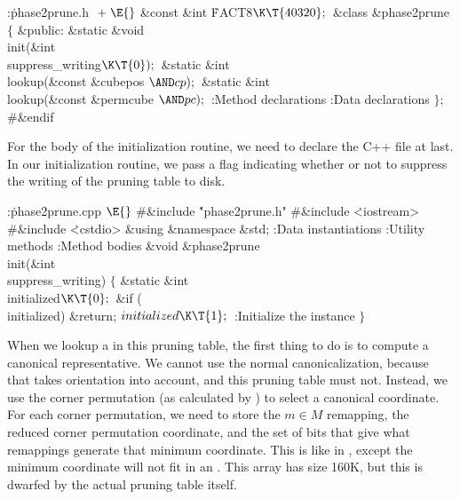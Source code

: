 \Y\B\4:\.{phase2prune.h }\X${}\mathrel+\E{}$\6
\&{const} \&{int} \.{FACT8}${}\K\T{40320};{}$\6
\&{class} \&{phase2prune} ${}\{{}$\1\6
\4\&{public}:\6
\&{static} \&{void} \\{init}(\&{int} \\{suppress\_writing}${}\K\T{0});{}$\6
\&{static} \&{int} \\{lookup}(\&{const} \&{cubepos} ${}{\AND}\\{cp});{}$\6
\&{static} \&{int} \\{lookup}(\&{const} \&{permcube} ${}{\AND}\\{pc});{}$\7
:Method declarations\X\6
:Data declarations\X\2\6
${}\};{}$\6
\8\#\&{endif}\par
\fi

For the body of the initialization routine, we need to declare
the C++ file at last.  In our initialization routine, we pass
a flag indicating whether or not to suppress the writing of the
pruning table to disk.

\Y\B\4:\.{phase2prune.cpp }\X${}\E{}$\6
\8\#\&{include} \.{"phase2prune.h"}\6
\8\#\&{include} \.{<iostream>}\6
\8\#\&{include} \.{<cstdio>}\6
\&{using} \&{namespace} \&{std};\7
:Data instantiations\X\6
:Utility methods\X\6
:Method bodies\X\7
\&{void} \&{phase2prune}\DC\\{init}(\&{int} \\{suppress\_writing})\1\1\2\2\6
${}\{{}$\1\6
\&{static} \&{int} \\{initialized}${}\K\T{0};{}$\7
\&{if} (\\{initialized})\1\5
\&{return};\2\6
${}\\{initialized}\K\T{1};{}$\6
:Initialize the instance\X\6
\4${}\}{}$\2\par
\fi

When we lookup a  in this pruning table, the first thing
to
do is to compute a canonical representative.  We cannot use the normal
 canonicalization, because that takes orientation into
account, and this pruning table must not.  Instead, we use the corner
permutation (as calculated by ) to select a canonical
coordinate.  For each corner permutation, we need to store the $m\in
M$ remapping, the reduced corner permutation coordinate, and the set
of bits that give what remappings generate that minimum coordinate.
This is like  in , except the minimum
coordinate will not fit in an .  This array has size
160K, but this is dwarfed by the actual pruning table itself.

